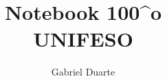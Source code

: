 \documentclass[oneside]{book}
\author{Gabriel Duarte}
\title{Notebook 100^o\\UNIFESO}
\begin{document}
\begin{otherlanguage}{brazil}

\maketitle
\tableofcontents










\end{otherlanguage}
\end{document}
